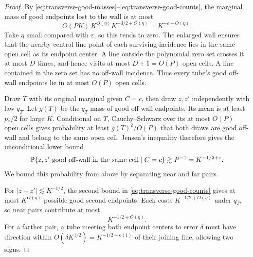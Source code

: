 \begin{proof}
By \eqref{eq:transverse-good-masses}--\eqref{eq:transverse-good-counts},
the marginal mass of good endpoints lost to the wall is at most
\begin{equation}\label{eq:transverse-wall-mass}
 O(PK)\,K^{O(\eta)}K^{-3/2+O(\eta)}
       =K^{-\varepsilon+O(\eta)}.
\end{equation}
Take $\eta$ small compared with $\varepsilon$, so this tends to
zero.  The enlarged wall ensures that the nearby central-line point
of each surviving incidence lies in the same open cell as its
endpoint center.  A line outside the polynomial zero set crosses
it at most $D$ times, and hence visits at most $D+1=O(P)$ open
cells.  A line contained in the zero set has no off-wall incidence.
Thus every tube's good off-wall endpoints lie in at most $O(P)$
open cells.

Draw $T$ with its original marginal given $C=c$, then draw $z,z'$
independently with law $q_T$.  Let $g(T)$ be the $q_T$ mass of
good off-wall endpoints.  Its mean is at least $p_*/2$ for large
$K$.  Conditional on $T$, Cauchy--Schwarz over its at most $O(P)$
open cells gives probability at least $g(T)^2/O(P)$ that both
draws are good off-wall and belong to the same open cell.
Jensen's inequality therefore gives the unconditional lower bound
\begin{equation}\label{eq:transverse-pair-lower}
 \mathbb P\{z,z'\text{ good off-wall in the same cell}\mid C=c\}
       \gtrsim P^{-1}=K^{-1/2+\varepsilon}.
\end{equation}
We bound this probability from above by separating near and far
pairs.

For $|z-z'|\lesssim K^{-1/2}$, the second bound in
\eqref{eq:transverse-good-counts} gives at most $K^{O(\eta)}$
possible good second endpoints.  Each costs
$K^{-1/2+O(\eta)}$ under $q_T$, so near pairs contribute at most
\begin{equation}\label{eq:transverse-near-pairs}
 K^{-1/2+O(\eta)}.
\end{equation}
For a farther pair, a tube meeting both endpoint centers to error
$\delta$ must have direction within
$O(\delta K^{1/2})=K^{-1/2+o(1)}$ of their joining line, allowing
two signs.


\end{proof}
